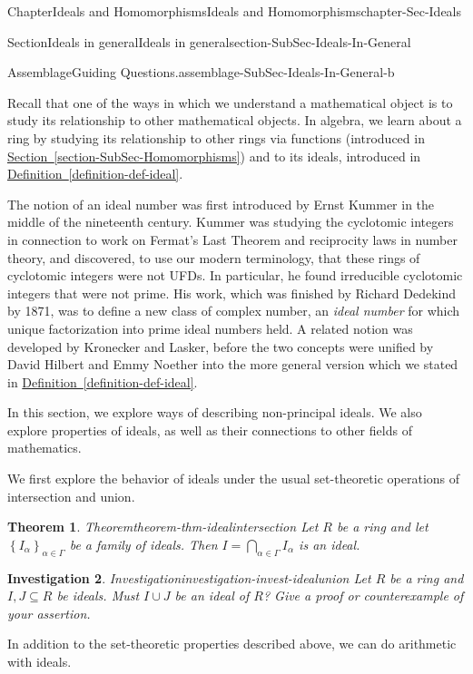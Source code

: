 \documentclass[oneside,10pt,]{book}
\newcommand{\xreffont}{\relax}
\numberwithin{equation}{section}
\newcommand{\set}[1]{\left\{ {#1} \right\}}
\newtheorem{theorem}{Theorem}[section]
\newtheorem{investigation}[theorem]{Investigation}
\begin{document}
\begin{chapterptx}{Chapter}{Ideals and Homomorphisms}{}{Ideals and Homomorphisms}{}{}{chapter-Sec-Ideals}
\begin{sectionptx}{Section}{Ideals in general}{}{Ideals in general}{}{}{section-SubSec-Ideals-In-General}
\begin{assemblage}{Assemblage}{Guiding Questions.}{assemblage-SubSec-Ideals-In-General-b}
\begin{itemize}[label=\textbullet]
\end{itemize}
%
\end{assemblage}
\begin{introduction}{}%
Recall that one of the ways in which we understand a mathematical object is to study its relationship to other mathematical objects. In algebra, we learn about a ring by studying its relationship to other rings via functions (introduced in \hyperref[section-SubSec-Homomorphisms]{Section~{\xreffont\ref{section-SubSec-Homomorphisms}}}) and to its ideals, introduced in \hyperref[definition-def-ideal]{Definition~{\xreffont\ref{definition-def-ideal}}}.%
\par
The notion of an ideal number was first introduced by Ernst Kummer in the middle of the nineteenth century. Kummer was studying the cyclotomic integers in connection to work on Fermat's Last Theorem and reciprocity laws in number theory, and discovered, to use our modern terminology, that these rings of cyclotomic integers were not UFDs. In particular, he found irreducible cyclotomic integers that were not prime. His work, which was finished by Richard Dedekind by 1871, was to define a new class of complex number, an \emph{ideal number} for which unique factorization into prime ideal numbers held. A related notion was developed by Kronecker and Lasker, before the two concepts were unified by David Hilbert and Emmy Noether into the more general version which we stated in \hyperref[definition-def-ideal]{Definition~{\xreffont\ref{definition-def-ideal}}}.%
\par
In this section, we explore ways of describing non-principal ideals. We also explore properties of ideals, as well as their connections to other fields of mathematics.%
\end{introduction}%
We first explore the behavior of ideals under the usual set-theoretic operations of intersection and union.%
\begin{theorem}{Theorem}{}{}{theorem-thm-idealintersection}%
Let \(R\) be a ring and let \(\set{I_{\alpha}}_{\alpha\in \Gamma}\) be a family of ideals. Then \(I = \bigcap\limits_{\alpha\in \Gamma} I_\alpha\) is an ideal.%
\end{theorem}
\begin{investigation}{Investigation}{}{investigation-invest-idealunion}%
Let \(R\) be a ring and \(I,J\subseteq R\) be ideals. Must \(I\cup J\) be an ideal of \(R\)? Give a proof or counterexample of your assertion.%
\end{investigation}%
In addition to the set-theoretic properties described above, we can do arithmetic with ideals.%

\end{sectionptx}
\end{chapterptx}
\end{document}
